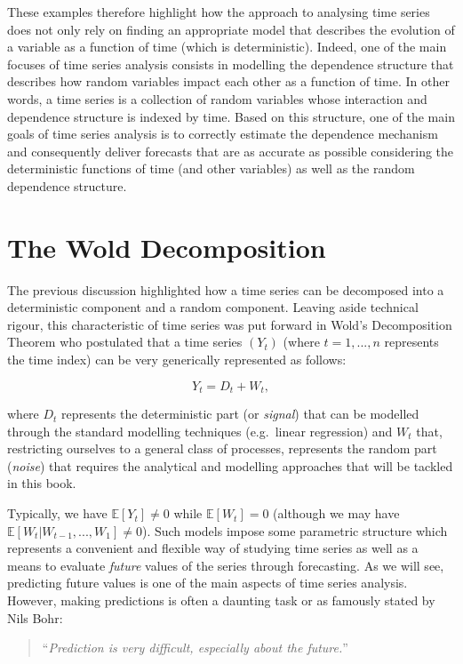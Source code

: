 \documentclass[]{book}
\theoremstyle{definition}
\theoremstyle{definition}
\theoremstyle{definition}
\theoremstyle{remark}
\begin{document}
These examples therefore highlight how the approach to analysing time
series does not only rely on finding an appropriate model that describes
the evolution of a variable as a function of time (which is
deterministic). Indeed, one of the main focuses of time series analysis
consists in modelling the dependence structure that describes how random
variables impact each other as a function of time. In other words, a
time series is a collection of random variables whose interaction and
dependence structure is indexed by time. Based on this structure, one of
the main goals of time series analysis is to correctly estimate the
dependence mechanism and consequently deliver forecasts that are as
accurate as possible considering the deterministic functions of time
(and other variables) as well as the random dependence structure.

\section{The Wold Decomposition}\label{the-wold-decomposition}

The previous discussion highlighted how a time series can be decomposed
into a deterministic component and a random component. Leaving aside
technical rigour, this characteristic of time series was put forward in
Wold's Decomposition Theorem who postulated that a time series \((Y_t)\)
(where \(t = 1,...,n\) represents the time index) can be very
generically represented as follows:

\[Y_t = D_t + W_t,\]

where \(D_t\) represents the deterministic part (or \emph{signal}) that
can be modelled through the standard modelling techniques (e.g.~linear
regression) and \(W_t\) that, restricting ourselves to a general class
of processes, represents the random part (\emph{noise}) that requires
the analytical and modelling approaches that will be tackled in this
book.

Typically, we have \(\mathbb{E}[Y_t] \neq 0\) while
\(\mathbb{E}[W_t] = 0\) (although we may have
\(\mathbb{E}[W_t | W_{t-1}, ..., W_1] \neq 0\)). Such models impose some
parametric structure which represents a convenient and flexible way of
studying time series as well as a means to evaluate \emph{future} values
of the series through forecasting. As we will see, predicting future
values is one of the main aspects of time series analysis. However,
making predictions is often a daunting task or as famously stated by
Nils Bohr:

\begin{quote}
``\emph{Prediction is very difficult, especially about the future.}''
\end{quote}
\end{document}
